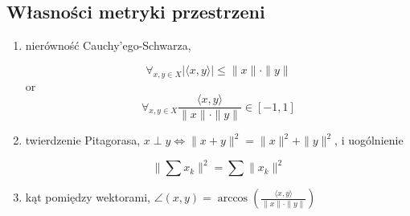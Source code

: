 \documentclass{article}
\begin{document}
\subsection{Własności metryki przestrzeni}
\begin{enumerate}
\item nierówność Cauchy'ego-Schwarza,

$$\forall_{x,y \in X} |\langle x,y \rangle| \leq \|x\| \cdot \|y\|$$
or
$$\forall_{x,y \in X} \frac{\langle x,y \rangle}{\|x\| \cdot \|y\|} \in [-1,1]$$

\item twierdzenie Pitagorasa, $x \perp y \iff \|x+y\|^2 = \|x\|^2 + \|y\|^2$, i uogólnienie

$$\|\sum x_k\|^2 = \sum \|x_k\|^2$$

\item kąt pomiędzy wektorami, $\angle(x,y) = \arccos\left(\frac{\langle x,y \rangle}{\|x\| \cdot \|y\|}\right)$
\end{enumerate}
\end{document}
